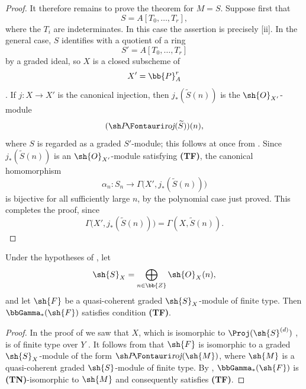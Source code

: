 \begin{proof}
It therefore remains to prove the theorem for $M=S$.
Suppose first that
\[
  S=A[T_0,\ldots,T_r],
\]
where the $T_i$ are indeterminates.
In this case the assertion is precisely [ii].
In the general case, $S$ identifies with a quotient of a ring
\[
  S'=A[T_0,\ldots,T_r]
\]
by a graded ideal, so $X$ is a closed subscheme of
\[
  X'=\bb{P}_A^r
\]
.
If $j:X\to X'$ is the canonical injection, then $j_*(\widetilde{S}(n))$ is the $\sh{O}_{X'}$-module
\[
  (\shProj(\widetilde{S}))(n),
\]
where $S$ is regarded as a graded $S'$-module; this follows at once from .
Since $j_*(\widetilde{S}(n))$ is an $\sh{O}_{X'}$-module satisfying \textbf{(TF)}, the canonical homomorphism
\[
  \alpha_n:S_n\longrightarrow
  \Gamma\bigl(X',j_*(\widetilde{S}(n))\bigr)
\]
is bijective for all sufficiently large $n$, by the polynomial case just proved.
This completes the proof, since
\[
  \Gamma\bigl(X',j_*(\widetilde{S}(n))\bigr)
  =\Gamma(X,\widetilde{S}(n)).
\]
\end{proof}

\begin{corollary}[2.3.2]
\label{III.2.3.2}
Under the hypotheses of , let
\[
  \sh{S}_X=\bigoplus_{n\in\bb{Z}}\sh{O}_X(n),
\]
and let $\sh{F}$ be a quasi-coherent graded $\sh{S}_X$-module of finite type.
Then $\bbGamma_*(\sh{F})$ satisfies condition \textbf{(TF)}.
\end{corollary}

\begin{proof}
In the proof of  we saw that $X$, which is isomorphic to $\Proj(\sh{S}^{(d)})$ , is of finite type over $Y$ .
It follows from  that $\sh{F}$ is isomorphic to a graded $\sh{S}_X$-module of the form $\shProj(\sh{M})$, where $\sh{M}$ is a quasi-coherent graded $\sh{S}$-module of finite type.
By , $\bbGamma_*(\sh{F})$ is \textbf{(TN)}-isomorphic to $\sh{M}$ and consequently satisfies \textbf{(TF)}.
\end{proof}

